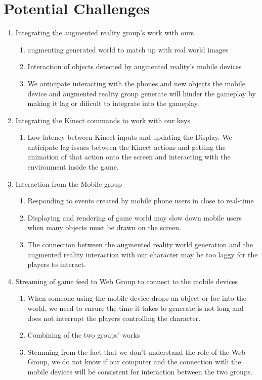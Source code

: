 \documentclass[10pt,letterpaper,oneside,english]{report}
\begin{document}
\section{Potential Challenges}
\label{Potential Challenges}
	\begin{enumerate}
		\item Integrating the augmented reality group's work with ours
		\begin{enumerate}
			\item augmenting generated world to match up with real world images
			\item Interaction of objects detected by augmented reality's mobile devices
			\item We anticipate interacting with the phones and new objects the mobile device and augmented reality group generate will hinder the gameplay by making it lag or dificult to integrate into the gameplay.
		\end{enumerate}
		
		\item Integrating the Kinect commands to work with our keys
		\begin{enumerate}
			\item Low latency between Kinect inputs and updating the Display. We anticipate lag issues between the Kinect actions and getting the animation of that action onto the screen and interacting with the environment inside the game.
		\end{enumerate}
		
		\item Interaction from the Mobile group
		\begin{enumerate}
			\item Responding to events created by mobile phone users in close to real-time
			\item Displaying and rendering of game world may slow down mobile users when many objects must be drawn on the screen.
			\item The connection between the augmented reality world generation and the augmented reality interaction with our character may be too laggy for the players to interact.
		\end{enumerate}
		
		\item Streaming of game feed to Web Group to connect to the mobile devices
		\begin{enumerate}
			\item When someone using the mobile device drops an object or foe into the world, we need to ensure the time it takes to generate is not long and does not interrupt the players controlling the character.
			\item Combining of the two groups' works
			\item Stemming from the fact that we don't understand the role of the Web Group, we do not know if our computer and the connection with the mobile devices will be consistent for interaction between the two groups.
		\end{enumerate}


\end{enumerate}
\end{document}
